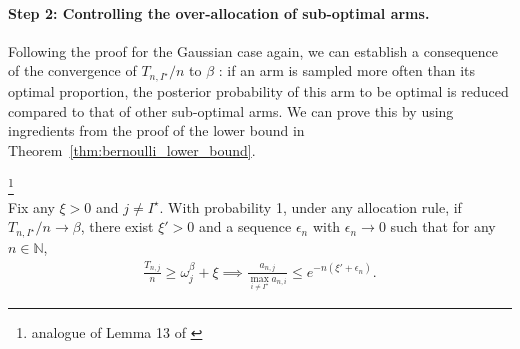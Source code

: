 \paragraph{Step 2: Controlling the over-allocation of sub-optimal arms.}
Following the proof for the Gaussian case again, we can establish a consequence of the convergence of $T_{n,I^\star} / n$ to $\beta$ : if an arm is sampled more often than its optimal proportion, the posterior probability of this arm to be optimal is reduced compared to that of other sub-optimal arms. We can prove this by using ingredients from the proof of the lower bound in Theorem~\ref{thm:bernoulli_lower_bound}.

\begin{lemma}\label{lemma:over_allocation_bernoulli}\footnote{analogue of Lemma 13 of \cite{russo2016ttts}}\ \\
	Fix any $\xi > 0$ and $j \neq I^\star$. With probability 1, under any allocation rule, if $T_{n,I^\star}/n \rightarrow \beta$, there exist $\xi' > 0$ and a sequence $\epsilon_n$ with $\epsilon_n \rightarrow 0$ such that for any $n \in \mathbb{N}$, 
	\begin{align*}
	\frac{T_{n,j}}{n} \geq \omega_j^\beta + \xi \implies \frac{a_{n,j}}{\max_{i \neq I^\star} a_{n,i}} \leq e^{-n (\xi' + \epsilon_n)}.
	\end{align*}
\end{lemma}

